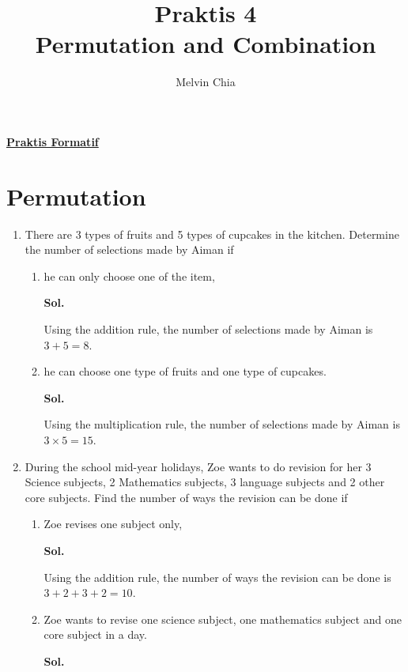 \documentclass{report}
\title{Praktis 4\\Permutation and Combination}
\author{Melvin Chia}
\newcommand{\sol}[1]{

      \noindent \textbf{Sol.}
}
\def\eos{\quad\hbox{\rlap{\hbox{\vrule depth 1.5pt height 2.6mm width 0.2mm \hskip 1mm \vrule height 2.6mm width 0.2mm}}{\vbox{\hrule height 0.2mm width 1.4mm \vskip 2.8mm \hrule depth 1.5pt height -0.35mm width 1.2mm}}}}
\begin{document}
\maketitle

\begin{multicols*}{2}
      \noindent\Large{\underline{\textbf{Praktis Formatif}}}
      \normalsize
      \section{Permutation}
      \begin{enumerate}
            \item There are 3 types of fruits and 5 types of cupcakes in the kitchen. Determine
                  the number of selections made by Aiman if
                  \begin{enumerate}
                        \item he can only choose one of the item, \sol{}

                              Using the addition rule, the number of selections made by Aiman is $3 + 5 = 8$.
                              $\eos$

                        \item he can choose one type of fruits and one type of cupcakes. \sol{}

                              Using the multiplication rule, the number of selections made by Aiman is $3
                                    \times 5 = 15$. $\eos$
                  \end{enumerate}

            \item During the school mid-year holidays, Zoe wants to do revision for her 3 Science
                  subjects, 2 Mathematics subjects, 3 language subjects and 2 other core
                  subjects. Find the number of ways the revision can be done if
                  \begin{enumerate}
                        \item Zoe revises one subject only, \sol{}

                              Using the addition rule, the number of ways the revision can be done is $3 + 2
                                    + 3 + 2 = 10$. $\eos$

                        \item Zoe wants to revise one science subject, one mathematics subject and one core
                              subject in a day. \sol{}


\end{enumerate}
\end{enumerate}
\end{multicols*}
\end{document}
